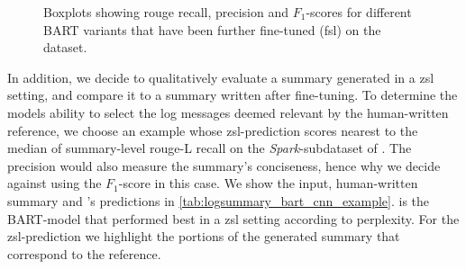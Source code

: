 \begin{figure}[htbp]
\centering
{}%
\hfill{}%
%
\hfill{}%
\caption{Boxplots showing \acs*{rouge} recall, precision and \(F_1\)-scores
for different BART variants that have been further fine-tuned (\acs*{fsl}) on the \logsummary{} dataset.}
\label{fig:bart_trial_fsl_logsummary}
\end{figure}

In addition, we decide to qualitatively evaluate a summary generated in a \ac{zsl} setting,
and compare it to a summary written after fine-tuning.
To determine the models ability to select the log messages deemed relevant by the human-written reference,
we choose an example whose \ac{zsl}-prediction scores nearest to the median of
summary-level \acs*{rouge}-L recall on the \emph{Spark}-subdataset of \logsummary{}.
The precision would also measure the summary's conciseness, hence why we decide against using the \(F_1\)-score in this case.
We show the input, human-written summary
and 's predictions in \autoref{tab:logsummary_bart_cnn_example}.
 is the BART-model that performed best in a \ac{zsl} setting according to perplexity.
For the \ac{zsl}-prediction we highlight the portions of the generated summary that correspond to the reference.

